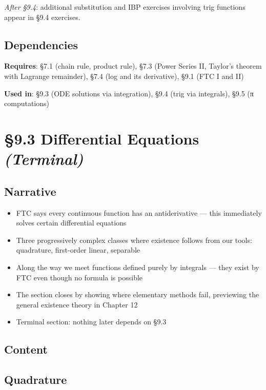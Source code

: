 \documentclass[
  10pt,
  letterpaper,
]{scrbook}
\providecommand{\tightlist}{%
  \setlength{\itemsep}{0pt}\setlength{\parskip}{0pt}}
\begin{document}
\emph{After §9.4}: additional substitution and IBP exercises involving
trig functions appear in §9.4 exercises.

\subsection{Dependencies}\label{dependencies-39}

\textbf{Requires}: §7.1 (chain rule, product rule), §7.3 (Power Series
II, Taylor's theorem with Lagrange remainder), §7.4 (log and its
derivative), §9.1 (FTC I and II)

\textbf{Used in}: §9.3 (ODE solutions via integration), §9.4 (trig via
integrals), §9.5 (π computations)

\section{\texorpdfstring{§9.3 Differential Equations
\emph{(Terminal)}}{§9.3 Differential Equations (Terminal)}}\label{differential-equations-terminal}

\subsection{Narrative}\label{narrative-40}

\begin{itemize}
\tightlist
\item
  FTC says every continuous function has an antiderivative --- this
  immediately solves certain differential equations
\item
  Three progressively complex classes where existence follows from our
  tools: quadrature, first-order linear, separable
\item
  Along the way we meet functions defined purely by integrals --- they
  exist by FTC even though no formula is possible
\item
  The section closes by showing where elementary methods fail,
  previewing the general existence theory in Chapter 12
\item
  Terminal section: nothing later depends on §9.3
\end{itemize}

\subsection{Content}\label{content-40}

\subsection{Quadrature}\label{quadrature}
\end{document}
